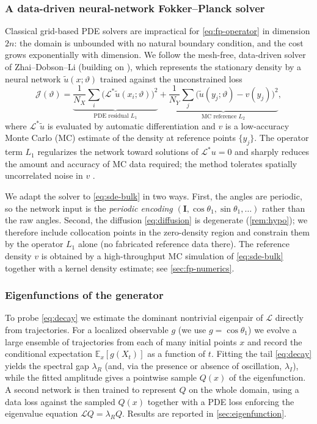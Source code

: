 \documentclass[11pt,a4paper]{article}
\theoremstyle{definition}
\newcommand{\E}{\mathbb{E}}
\numberwithin{equation}{section}   %
\newcommand{\bI}{\mathbf{I}}
\newcommand{\Lgen}{\mathcal{L}}
\newcommand{\Ladj}{\mathcal{L}^{*}}
\begin{document}
\subsubsection{A data-driven neural-network Fokker--Planck solver}
Classical grid-based PDE solvers are impractical for \eqref{eq:fp-operator} in
dimension $2n$: the domain is unbounded with no natural boundary condition, and
the cost grows exponentially with dimension. We follow the mesh-free,
data-driven solver of Zhai--Dobson--Li \cite{ZhaiDobsonLi} (building on
\cite{Li2019,DobsonLiZhai}), which represents the stationary density by a neural
network $\tilde u(x;\vartheta)$ trained against the unconstrained loss
\begin{equation}\label{eq:nn-loss}
  \mathcal{J}(\vartheta)
  = \underbrace{\frac{1}{N_X}\sum_{i}\big(\Ladj \tilde u(x_i;\vartheta)\big)^2}_{\text{PDE residual } L_1}
  + \underbrace{\frac{1}{N_Y}\sum_{j}\big(\tilde u(y_j;\vartheta)-v(y_j)\big)^2}_{\text{MC reference } L_2},
\end{equation}
where $\Ladj\tilde u$ is evaluated by automatic differentiation and $v$ is a
low-accuracy Monte Carlo (MC) estimate of the density at reference points
$\{y_j\}$. The operator term $L_1$ regularizes the network toward solutions of
$\Ladj u=0$ and sharply reduces the amount and accuracy of MC data required;
the method tolerates spatially uncorrelated noise in $v$ \cite{ZhaiDobsonLi}.

We adapt the solver to \eqref{eq:sde-bulk} in two ways. First, the angles are
periodic, so the network input is the \emph{periodic encoding}
$(\bI,\cos\theta_1,\sin\theta_1,\dots)$ rather than the raw angles. Second, the
diffusion \eqref{eq:diffusion} is degenerate (\cref{rem:hypo}); we therefore
include collocation points in the zero-density region and constrain them by the
operator $L_1$ alone (no fabricated reference data there). The reference density
$v$ is obtained by a high-throughput MC simulation of \eqref{eq:sde-bulk}
together with a kernel density estimate; see \cref{sec:fp-numerics}.

\subsubsection{Eigenfunctions of the generator}
To probe \eqref{eq:decay} we estimate the dominant nontrivial eigenpair of
$\Lgen$ directly from trajectories. For a localized observable $g$ (we use
$g=\cos\theta_1$) we evolve a large ensemble of trajectories from each of many
initial points $x$ and record the conditional expectation $\E_x[g(X_t)]$ as a
function of $t$. Fitting the tail \eqref{eq:decay} yields the spectral gap
$\lambda_R$ (and, via the presence or absence of oscillation, $\lambda_I$),
while the fitted amplitude gives a pointwise sample $Q(x)$ of the eigenfunction.
A second network is then trained to represent $Q$ on the whole domain, using a
data loss against the sampled $Q(x)$ together with a PDE loss enforcing the
eigenvalue equation $\Lgen Q=\lambda_R Q$. Results are reported in
\cref{sec:eigenfunction}.
\end{document}
